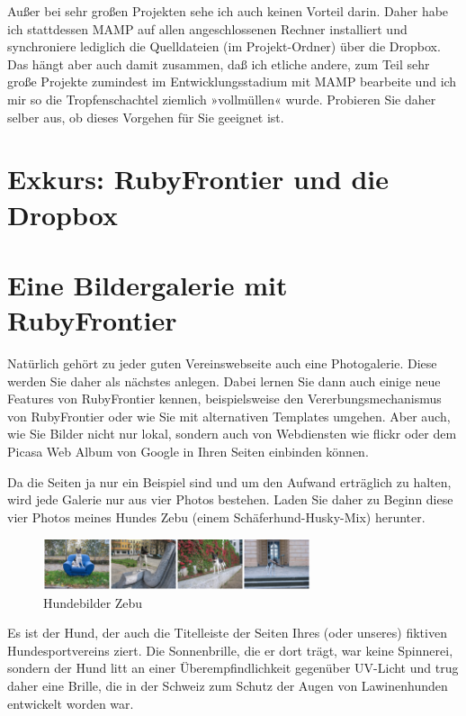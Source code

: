 \documentclass[11pt]{report}
\begin{document}
Außer bei sehr großen Projekten sehe ich auch keinen Vorteil
darin. Daher habe ich stattdessen MAMP auf allen angeschlossenen
Rechner installiert und synchroniere lediglich die Quelldateien (im
Projekt-Ordner) über die Dropbox. Das hängt aber auch damit zusammen,
daß ich etliche andere, zum Teil sehr große Projekte zumindest im
Entwicklungsstadium mit MAMP bearbeite und ich mir so die
Tropfenschachtel ziemlich »vollmüllen« wurde. Probieren Sie daher
selber aus, ob dieses Vorgehen für Sie geeignet ist.
\chapter{Exkurs: RubyFrontier und die Dropbox}
\label{sec-2-3}
\chapter{Eine Bildergalerie mit RubyFrontier}
\label{sec-2-4}


Natürlich gehört zu jeder guten Vereinswebseite auch eine
Photogalerie. Diese werden Sie daher als nächstes anlegen. Dabei
lernen Sie dann auch einige neue Features von RubyFrontier kennen,
beispielsweise den Vererbungsmechanismus von RubyFrontier oder wie Sie
mit alternativen Templates umgehen. Aber auch, wie Sie Bilder nicht
nur lokal, sondern auch von Webdiensten wie flickr oder dem Picasa Web
Album von Google in Ihren Seiten einbinden können.


Da die Seiten ja nur ein Beispiel sind und um den Aufwand erträglich
zu halten, wird jede Galerie nur aus vier Photos bestehen. Laden Sie
daher zu Beginn diese vier Photos meines Hundes Zebu (einem
Schäferhund-Husky-Mix) herunter.

\begin{figure}[h!]
\centering
\includegraphics[width=0.7\textwidth]{./images/hundebilder01.png}
\caption{\label{hundebilder01}Hundebilder Zebu}
\end{figure}


Es ist der Hund, der auch die Titelleiste der Seiten Ihres (oder
unseres) fiktiven Hundesportvereins ziert. Die Sonnenbrille, die er
dort trägt, war keine Spinnerei, sondern der Hund litt an einer
Überempfindlichkeit gegenüber UV-Licht und trug daher eine Brille, die
in der Schweiz zum Schutz der Augen von Lawinenhunden entwickelt
worden war.
\end{document}
